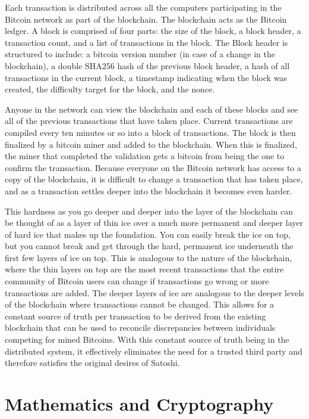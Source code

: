\documentclass{article}
\begin{document}
	Each transaction is distributed across all the computers participating in the Bitcoin network as part of the blockchain. The blockchain acts as the Bitcoin ledger. A block is comprised of four parts: the size of the block, a block header, a transaction count, and a list of transactions in the block. The Block header is structured to include: a bitcoin version number (in case of a change in the blockchain), a double SHA256 hash of the previous block header, a hash of all transactions in the current block, a timestamp indicating when the block was created, the difficulty target for the block, and the nonce.
	
	Anyone in the network can view the blockchain and each of these blocks and see all of the previous transactions that have taken place. Current transactions are compiled every ten minutes or so into a block of transactions. The block is then finalized by a bitcoin miner and added to the blockchain. When this is finalized, the miner that completed the validation gets a bitcoin from being the one to confirm the transaction. Because everyone on the Bitcoin network has access to a copy of the blockchain, it is difficult to change a transaction that has taken place, and as a transaction settles deeper into the blockchain it becomes even harder.
	
	This hardness as you go deeper and deeper into the layer of the blockchain can be thought of as a layer of thin ice over a much more permanent and deeper layer of hard ice that makes up the foundation. You can easily break the ice on top, but you cannot break and get through the hard, permanent ice underneath the first few layers of ice on top. This is analogous to the nature of the blockchain, where the thin layers on top are the most recent transactions that the entire community of Bitcoin users can change if transactions go wrong or more transactions are added. The deeper layers of ice are analogous to the deeper levels of the blockchain where transactions cannot be changed. This allows for a constant source of truth per transaction to be derived from the existing blockchain that can be used to reconcile discrepancies between individuals competing for mined Bitcoins. With this constant source of truth being in the distributed system, it effectively eliminates the need for a trusted third party and therefore satisfies the original desires of Satoshi.




\section{Mathematics and Cryptography}
\end{document}
